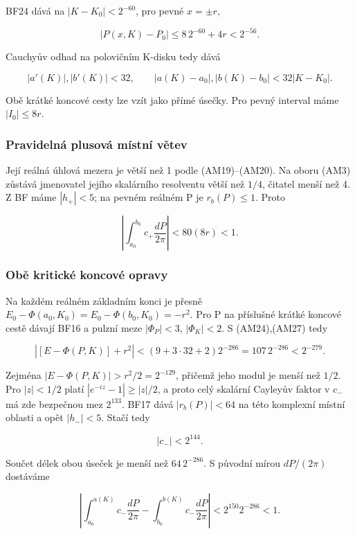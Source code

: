 \documentclass[11pt,a4paper]{article}
\theoremstyle{remark}\newtheorem{remark}[theorem]{Poznámka}
\numberwithin{equation}{section}
\begin{document}
BF24 dává na \(|K-K_0|<2^{-60}\), pro pevné \(x=\pm r\),

\[
|P(x,K)-P_0|\le8\,2^{-60}+4r<2^{-56}.
\]

Cauchyův odhad na polovičním K-disku tedy dává

\[
|a'(K)|,|b'(K)|<32,
\qquad
|a(K)-a_0|,|b(K)-b_0|<32|K-K_0|.
\tag{AM27}
\]

Obě krátké koncové cesty lze vzít jako přímé úsečky. Pro pevný interval
máme \(|I_0|\le8r\).

\hypertarget{pravidelnuxe1-plusovuxe1-muxedstnuxed-vux11btev}{%
\subsubsection{Pravidelná plusová místní
větev}\label{pravidelnuxe1-plusovuxe1-muxedstnuxed-vux11btev}}

Její reálná úhlová mezera je větší než 1 podle (AM19)--(AM20). Na oboru
(AM3) zůstává jmenovatel jejího skalárního resolventu větší než \(1/4\),
čitatel menší než 4. Z BF máme \(|h_+|<5\); na pevném reálném P je
\(r_b(P)\le1\). Proto

\[
\left|\int_{a_0}^{b_0}c_+\frac{dP}{2\pi}\right|
<80(8r)<1.
\tag{AM28}
\]

\hypertarget{obux11b-kritickuxe9-koncovuxe9-opravy}{%
\subsubsection{Obě kritické koncové
opravy}\label{obux11b-kritickuxe9-koncovuxe9-opravy}}

Na každém reálném základním konci je přesně
\(E_0-\Phi(a_0,K_0)=E_0-\Phi(b_0,K_0)=-r^2\). Pro P na příslušné krátké
koncové cestě dávají BF16 a pulzní meze \(|\Phi_P|<3\), \(|\Phi_K|<2\).
S (AM24),(AM27) tedy

\[
|[E-\Phi(P,K)]+r^2|
< (9+3\cdot32+2)2^{-286}
=107\,2^{-286}<2^{-279}.
\tag{AM29}
\]

Zejména \(|E-\Phi(P,K)|>r^2/2=2^{-129}\), přičemž jeho modul je menší
než \(1/2\). Pro \(|z|<1/2\) platí \(|e^{-iz}-1|\ge|z|/2\), a proto celý
skalární Cayleyův faktor v \(c_-\) má zde bezpečnou mez \(2^{133}\).
BF17 dává \(|r_b(P)|<64\) na této komplexní místní oblasti a opět
\(|h_-|<5\). Stačí tedy

\[
|c_-|<2^{144}.
\]

Součet délek obou úseček je menší než \(64\,2^{-286}\). S původní mírou
\(dP/(2\pi)\) dostáváme

\[
\left|\int_{a_0}^{a(K)}c_-\frac{dP}{2\pi}
-\int_{b_0}^{b(K)}c_-\frac{dP}{2\pi}\right|
<2^{150}2^{-286}<1.
\tag{AM30}
\]
\end{document}
